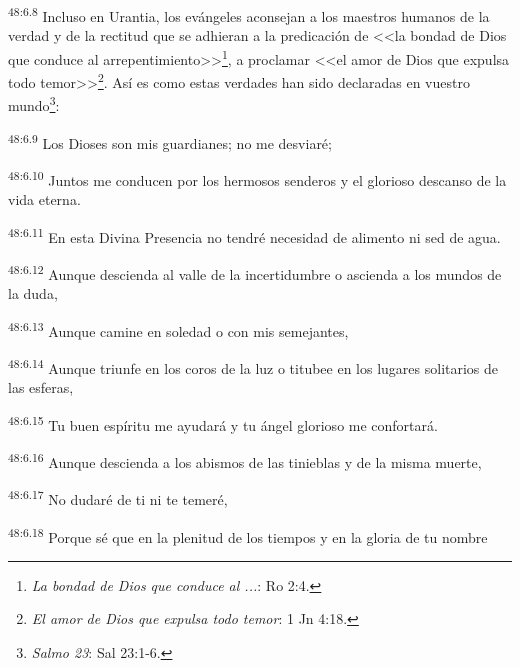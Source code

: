 \par
\textsuperscript{48:6.8} Incluso en Urantia, los evángeles aconsejan a los maestros humanos de la verdad y de la rectitud que se adhieran a la predicación de <<la bondad de Dios que conduce al arrepentimiento>>\footnote{\textit{La bondad de Dios que conduce al ...}: Ro 2:4.}, a proclamar <<el amor de Dios que expulsa todo temor>>\footnote{\textit{El amor de Dios que expulsa todo temor}: 1 Jn 4:18.}. Así es como estas verdades han sido declaradas en vuestro mundo\footnote{\textit{Salmo 23}: Sal 23:1-6.}:

\par
\textsuperscript{48:6.9} Los Dioses son mis guardianes; no me desviaré;

\par
\textsuperscript{48:6.10} Juntos me conducen por los hermosos senderos y el glorioso descanso de la vida eterna.

\par
\textsuperscript{48:6.11} En esta Divina Presencia no tendré necesidad de alimento ni sed de agua.

\par
\textsuperscript{48:6.12} Aunque descienda al valle de la incertidumbre o ascienda a los mundos de la duda,

\par
\textsuperscript{48:6.13} Aunque camine en soledad o con mis semejantes,

\par
\textsuperscript{48:6.14} Aunque triunfe en los coros de la luz o titubee en los lugares solitarios de las esferas,

\par
\textsuperscript{48:6.15} Tu buen espíritu me ayudará y tu ángel glorioso me confortará.

\par
\textsuperscript{48:6.16} Aunque descienda a los abismos de las tinieblas y de la misma muerte,

\par
\textsuperscript{48:6.17} No dudaré de ti ni te temeré,

\par
\textsuperscript{48:6.18} Porque sé que en la plenitud de los tiempos y en la gloria de tu nombre

